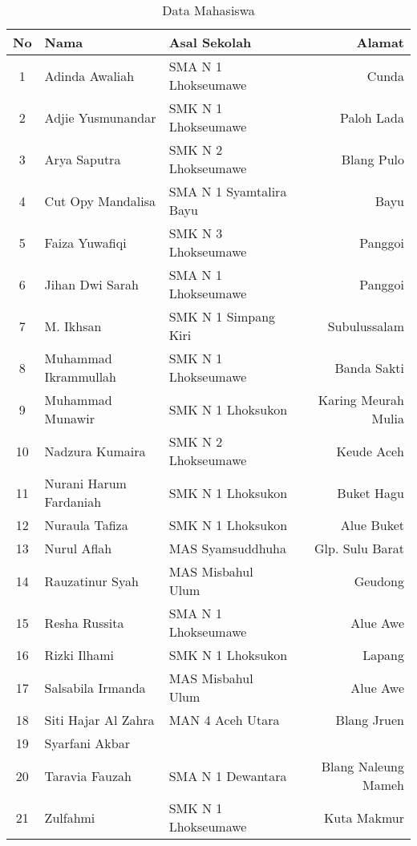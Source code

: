 \documentclass[a4paper]{tufte-handout}
\begin{document}
\begin{table}[!ht]
\vspace*{.5cm}
\caption{Data Mahasiswa}
\label{tab:perkenalan}
\centering
\begin{tabular}{cllr} 
\toprule
No & Nama 				& Asal Sekolah 				& Alamat\\
\midrule
1 	& Adinda Awaliah	& SMA N 1 Lhokseumawe 		& Cunda \\
2 	& Adjie Yusmunandar	& SMK N 1 Lhokseumawe 		& Paloh Lada \\
3 	& Arya Saputra 		& SMK N 2 Lhokseumawe 		& Blang Pulo \\
4 	& Cut Opy Mandalisa	& SMA N 1 Syamtalira Bayu	& Bayu \\
5 	& Faiza Yuwafiqi	& SMK N 3 Lhokseumawe 		& Panggoi \\
6 	& Jihan Dwi Sarah	& SMA N 1 Lhokseumawe 		& Panggoi \\
7 	& M. Ikhsan			& SMK N 1 Simpang Kiri 		& Subulussalam \\
\midrule
8 	& Muhammad Ikrammullah		& SMK N 1 Lhokseumawe 	& Banda Sakti \\
9 	& Muhammad Munawir			& SMK N 1 Lhoksukon		& Karing Meurah Mulia \\
10 	& Nadzura Kumaira			& SMK N 2 Lhokseumawe 	& Keude Aceh \\
11 	& Nurani Harum Fardaniah	& SMK N 1 Lhoksukon 	& Buket Hagu \\
12 	& Nuraula Tafiza			& SMK N 1 Lhoksukon 	& Alue Buket \\
13 	& Nurul Aflah				& MAS Syamsuddhuha		& Glp. Sulu Barat \\
14 	& Rauzatinur Syah			& MAS Misbahul Ulum 	& Geudong \\
\midrule
15 	& Resha Russita			& SMA N 1 Lhokseumawe 	& Alue Awe \\
16 	& Rizki Ilhami			& SMK N 1 Lhoksukon 	& Lapang \\
17 	& Salsabila Irmanda		& MAS Misbahul Ulum 	& Alue Awe \\
18 	& Siti Hajar Al Zahra	& MAN 4 Aceh Utara & Blang Jruen \\
19 	& Syarfani Akbar		& & \\
20 	& Taravia Fauzah		& SMA N 1 Dewantara 	& Blang Naleung Mameh \\
21 	& Zulfahmi				& SMK N 1 Lhokseumawe	& Kuta Makmur \\
\bottomrule
\end{tabular}
\end{table}
\end{document}
